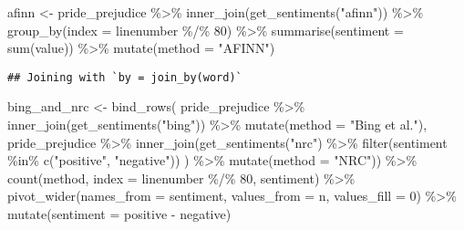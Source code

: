\documentclass[
]{article}
\newenvironment{Shaded}{\begin{snugshade}}{\end{snugshade}}
\newcommand{\AttributeTok}[1]{\textcolor[rgb]{0.77,0.63,0.00}{#1}}
\newcommand{\DecValTok}[1]{\textcolor[rgb]{0.00,0.00,0.81}{#1}}
\newcommand{\FunctionTok}[1]{\textcolor[rgb]{0.00,0.00,0.00}{#1}}
\newcommand{\NormalTok}[1]{#1}
\newcommand{\OtherTok}[1]{\textcolor[rgb]{0.56,0.35,0.01}{#1}}
\newcommand{\SpecialCharTok}[1]{\textcolor[rgb]{0.00,0.00,0.00}{#1}}
\newcommand{\StringTok}[1]{\textcolor[rgb]{0.31,0.60,0.02}{#1}}
\begin{document}
\begin{Shaded}
\begin{Highlighting}[]
\NormalTok{afinn }\OtherTok{\textless{}{-}}\NormalTok{ pride\_prejudice }\SpecialCharTok{\%\textgreater{}\%} 
  \FunctionTok{inner\_join}\NormalTok{(}\FunctionTok{get\_sentiments}\NormalTok{(}\StringTok{"afinn"}\NormalTok{)) }\SpecialCharTok{\%\textgreater{}\%} 
  \FunctionTok{group\_by}\NormalTok{(}\AttributeTok{index =}\NormalTok{ linenumber }\SpecialCharTok{\%/\%} \DecValTok{80}\NormalTok{) }\SpecialCharTok{\%\textgreater{}\%} 
  \FunctionTok{summarise}\NormalTok{(}\AttributeTok{sentiment =} \FunctionTok{sum}\NormalTok{(value)) }\SpecialCharTok{\%\textgreater{}\%} 
  \FunctionTok{mutate}\NormalTok{(}\AttributeTok{method =} \StringTok{"AFINN"}\NormalTok{)}
\end{Highlighting}
\end{Shaded}

\begin{verbatim}
## Joining with `by = join_by(word)`
\end{verbatim}

\begin{Shaded}
\begin{Highlighting}[]
\NormalTok{bing\_and\_nrc }\OtherTok{\textless{}{-}} \FunctionTok{bind\_rows}\NormalTok{(}
\NormalTok{  pride\_prejudice }\SpecialCharTok{\%\textgreater{}\%} 
    \FunctionTok{inner\_join}\NormalTok{(}\FunctionTok{get\_sentiments}\NormalTok{(}\StringTok{"bing"}\NormalTok{)) }\SpecialCharTok{\%\textgreater{}\%}
    \FunctionTok{mutate}\NormalTok{(}\AttributeTok{method =} \StringTok{"Bing et al."}\NormalTok{),}
\NormalTok{  pride\_prejudice }\SpecialCharTok{\%\textgreater{}\%} 
    \FunctionTok{inner\_join}\NormalTok{(}\FunctionTok{get\_sentiments}\NormalTok{(}\StringTok{"nrc"}\NormalTok{) }\SpecialCharTok{\%\textgreater{}\%} 
                 \FunctionTok{filter}\NormalTok{(sentiment }\SpecialCharTok{\%in\%} \FunctionTok{c}\NormalTok{(}\StringTok{"positive"}\NormalTok{, }
                                         \StringTok{"negative"}\NormalTok{))}
\NormalTok{    ) }\SpecialCharTok{\%\textgreater{}\%}
    \FunctionTok{mutate}\NormalTok{(}\AttributeTok{method =} \StringTok{"NRC"}\NormalTok{)) }\SpecialCharTok{\%\textgreater{}\%}
  \FunctionTok{count}\NormalTok{(method, }\AttributeTok{index =}\NormalTok{ linenumber }\SpecialCharTok{\%/\%} \DecValTok{80}\NormalTok{, sentiment) }\SpecialCharTok{\%\textgreater{}\%}
  \FunctionTok{pivot\_wider}\NormalTok{(}\AttributeTok{names\_from =}\NormalTok{ sentiment,}
              \AttributeTok{values\_from =}\NormalTok{ n,}
              \AttributeTok{values\_fill =} \DecValTok{0}\NormalTok{) }\SpecialCharTok{\%\textgreater{}\%} 
  \FunctionTok{mutate}\NormalTok{(}\AttributeTok{sentiment =}\NormalTok{ positive }\SpecialCharTok{{-}}\NormalTok{ negative)}
\end{Highlighting}
\end{Shaded}
\end{document}
